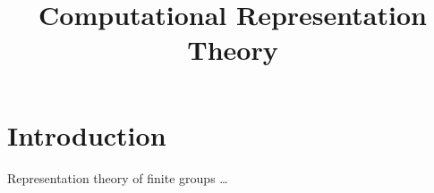 \documentclass[12pt]{amsart}
\title{Computational Representation Theory}
\begin{document}
\maketitle

\tableofcontents 

\section{Introduction}
\label{sec:intro}

Representation theory of finite groups \ldots

\nocite{*}




\end{document}
